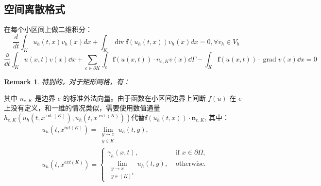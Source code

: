 \documentclass{article}
\newtheorem{remark}{Remark}
\numberwithin{equation}{subsection}    %
\begin{document}
\subsection{空间离散格式}
在每个小区间上做二维积分：
\begin{equation}
    \frac{d}{d t} \int_{K} u_{h}(t, x) v_{h}(x) d x+\int_{K} \operatorname{div} \mathbf{f}\left(u_{h}(t, x)\right) v_{h}(x) d x=0, \forall v_{h} \in V_{h}
\end{equation}
\begin{equation}
    \dfrac{\dd}{\dd t} \int_{K} u(x, t) v(x) \dd x+\sum_{e \in \partial K} \int_{e} \mathbf{f}(u(x, t)) \cdot n_{e, K} v(x) \dd \Gamma-\int_{K} \mathbf{f}(u(x, t)) \cdot \operatorname{grad} v(x) \dd x=0
\end{equation}
\begin{remark}
    特别的，对于矩形网格，有：
\end{remark}
其中 $n_{e,K}$ 是边界 $e$ 的标准外法向量。由于函数在小区间边界上间断 $f(u)$ 在 $e$ 上没有定义，和一维的情况类似，需要使用数值通量$h_{e, K}\left(u_{h}\left(t, x^{\operatorname{int}(K)}\right), u_{h}\left(t, x^{\operatorname{ext}(K)}\right)\right)$代替$\mathbf{f}\left(u_{h}(t, x)\right) \cdot \mathbf{n}_{e, K}$, 其中：
\begin{equation}
    \begin{array}{l}
        u_{h}\left(t, x^{i n t(K)}\right)= \lim _{\substack{y \rightarrow x \\
        y \in K}} u_{h}(t, y),                                              \\
        u_{h}\left(t, x^{e x t(K)}\right)=\left\{\begin{array}{ll}
                                                     \gamma_{h}(x, t),           & \text { if } x \in \partial \Omega, \\
                                                     \lim _{\substack{y \rightarrow x                                  \\
                                                     y \in(K)^{c}}} u_{h}(t, y), & \text { otherwise. }
                                                 \end{array}\right.
    \end{array}
\end{equation}

\end{document}
